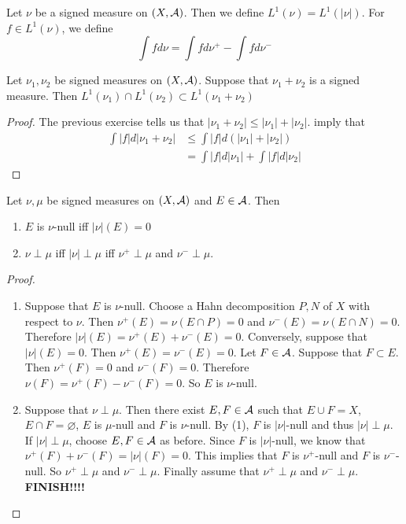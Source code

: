 \documentclass{book}
\begin{document}
	\begin{defn}  
		Let $\nu$ be a signed measure on $(X, \mathcal{A})$. Then we define $L^1(\nu) = L^1(|\nu|)$. For $f \in L^1(\nu)$, we define $$\int f d \nu = \int f d \nu^+ - \int f d\nu^-$$
	\end{defn}
	
	\begin{ex}  
		Let $\nu_1, \nu_2$ be signed measures on $(X, \mathcal{A})$. Suppose that $\nu_1 + \nu_2$ is a signed measure. Then 
		$L^1(\nu_1)\cap L^1(\nu_2) \subset L^1(\nu_1 + \nu_2)$
	\end{ex}
	
	\begin{proof}
		The previous exercise tells us that $|\nu_1 + \nu_2| \leq |\nu_1| + |\nu_2|$.  imply that 
		\begin{align*}
			\int |f|d |\nu_1 + \nu_2| 
			& \leq \int |f| d(|\nu_1|+|\nu_2|)\\
			&= \int |f|d |\nu_1| + \int |f| d|\nu_2|
		\end{align*}
	\end{proof}
	
	\begin{ex}  
		Let $\nu, \mu$ be signed measures on $(X,\mathcal{A})$ and $E \in \mathcal{A}$. Then 
		\begin{enumerate}
			\item $E$ is $\nu$-null iff $|\nu|(E) = 0$
			\item $\nu \perp \mu$ iff $|\nu| \perp \mu$ iff $\nu^+ \perp \mu$ and $\nu^- \perp \mu$.
		\end{enumerate}
	\end{ex}
	
	\begin{proof}
		\begin{enumerate}
			\item Suppose that $E$ is $\nu$-null. Choose a Hahn decomposition $P,N$ of $X$ with respect to $\nu$. Then $\nu^+(E) = \nu(E \cap P) = 0$ and $\nu^-(E) = \nu(E \cap N) = 0$. Therefore $|\nu|(E) = \nu^+(E) + \nu^-(E) = 0$. Conversely, suppose that $|\nu|(E) = 0$. Then $\nu^+(E) = \nu^-(E) = 0$. Let $F \in \mathcal{A}$. Suppose that $F \subset E$. Then $\nu^+(F) = 0$ and $\nu^-(F) = 0$. Therefore $\nu(F) = \nu^+(F) - \nu^-(F) = 0$. So $E$ is $\nu$-null.
			
			\item Suppose that $\nu \perp \mu$. Then there exist $E,F \in \mathcal{A}$ such that $E \cup F = X$, $E \cap F = \varnothing$, $E$ is $\mu$-null and $F$ is $\nu$-null. By (1), $F$ is $|\nu|$-null and thus $|\nu| \perp \mu$. If $|\nu| \perp \mu$, choose $E,F \in \mathcal{A}$ as before. Since $F$ is $|\nu|$-null, we know that $\nu^+(F) + \nu^-(F) = |\nu|(F) = 0$. This implies that $F$ is $\nu^+$-null and $F$ is $\nu^-$-null. So $\nu^+ \perp \mu$ and $\nu^- \perp \mu$. Finally assume that $\nu^+ \perp \mu$ and $\nu^- \perp \mu$. \textbf{FINISH!!!!}
			
		\end{enumerate}
	\end{proof}
	
\end{document}
